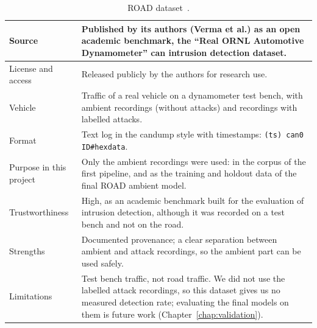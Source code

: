 \begin{table}[H]
\centering
\footnotesize
\caption{ROAD dataset~\cite{verma2020road}.}
\label{tab:app-road}
\begin{tabularx}{\textwidth}{|P{3cm}|Y|}
\hline
Source & Published by its authors (Verma et al.) as an open academic benchmark, the ``Real ORNL Automotive Dynamometer'' \gls{can} intrusion detection dataset. \\
\hline
License and access & Released publicly by the authors for research use. \\
\hline
Vehicle & Traffic of a real vehicle on a dynamometer test bench, with ambient recordings (without attacks) and recordings with labelled attacks. \\
\hline
Format & Text log in the candump style with timestamps: \texttt{(ts) can0 ID\#hexdata}. \\
\hline
Purpose in this project & Only the ambient recordings were used: in the corpus of the first pipeline, and as the training and holdout data of the final ROAD ambient model. \\
\hline
Trustworthiness & High, as an academic benchmark built for the evaluation of intrusion detection, although it was recorded on a test bench and not on the road. \\
\hline
Strengths & Documented provenance; a clear separation between ambient and attack recordings, so the ambient part can be used safely. \\
\hline
Limitations & Test bench traffic, not road traffic. We did not use the labelled attack recordings, so this dataset gives us no measured detection rate; evaluating the final models on them is future work (Chapter~\ref{chap:validation}). \\
\hline
\end{tabularx}
\end{table}


